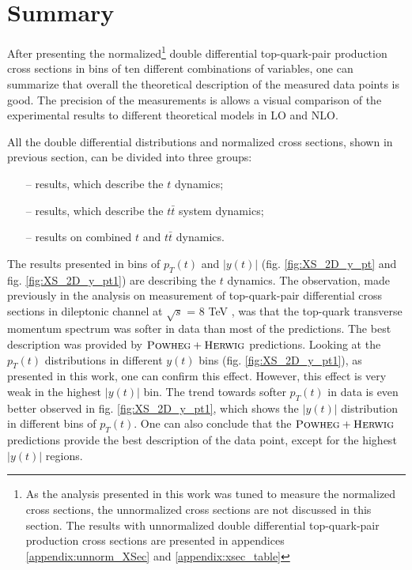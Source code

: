 \section{Summary}

After presenting the normalized\footnote{As the analysis presented in this work was tuned to measure the normalized cross sections, the unnormalized cross sections are not
discussed in this section. The results with unnormalized double differential top-quark-pair production cross sections are presented in appendices \ref{appendix:unnorm_XSec}
and \ref{appendix:xsec_table}} double differential top-quark-pair production cross sections in bins of ten different combinations of variables,
one can summarize that overall the theoretical description of the measured data points is good. The precision of the measurements is allows a visual 
comparison of the experimental results to different theoretical models in LO and NLO.

All the double differential distributions and normalized cross sections, shown in previous section, can be divided into three groups:

\begin{itemize}
 \item [--] results, which describe the $t$ dynamics;
 \item [--] results, which describe the $t\bar{t}$ system dynamics;
 \item [--] results on combined $t$  and $t\bar{t}$ dynamics.
\end{itemize}

The results presented in bins of $p_{T}(t)$ and $|y(t)|$ (fig. \ref{fig:XS_2D_y_pt} and fig. \ref{fig:XS_2D_y_pt1}) are describing the $t$
dynamics. The observation, made previously in the analysis on measurement of top-quark-pair differential cross sections in dileptonic channel at 
$\sqrt{s}$ = 8 TeV \cite{Asin2014Auth}, was that the top-quark transverse momentum spectrum was softer in data than most of the predictions. The best
description was provided by $\textsc{Powheg}+\textsc{Herwig}$ predictions. Looking at the $p_{T}(t)$ distributions in different $y(t)$ bins (fig. \ref{fig:XS_2D_y_pt1}), as presented in this work,
one can confirm this effect. However, this effect is very weak in the highest $|y(t)|$ bin. The trend towards softer $p_{T}(t)$ in data is even better
observed in fig. \ref{fig:XS_2D_y_pt1}, which shows the $|y(t)|$ distribution in different bins of $p_{T}(t)$. One can also conclude that the $\textsc{Powheg}+\textsc{Herwig}$
predictions provide the best description of the data point, except for the highest $|y(t)|$ regions.

